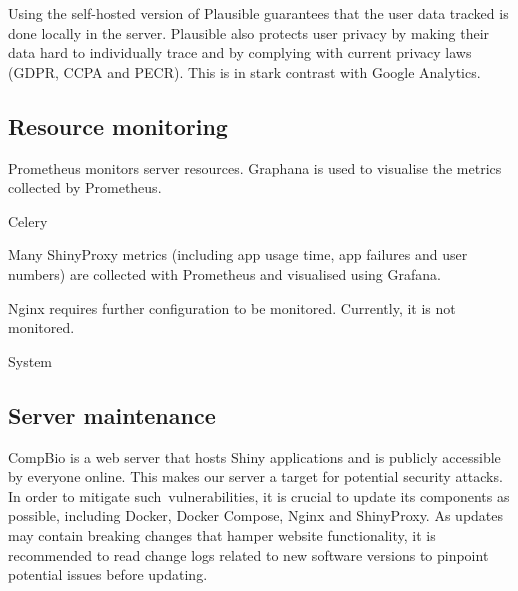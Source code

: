 
Using the self-hosted version of Plausible guarantees that the user data tracked is done locally in the server. Plausible also protects user privacy by making their data hard to individually trace and by complying with current privacy laws (GDPR, CCPA and PECR). This is in stark contrast with Google Analytics.

\subsection{Resource monitoring}

Prometheus monitors server resources. Graphana is used to visualise the metrics collected by Prometheus.

Celery %

Many ShinyProxy metrics (including app usage time, app failures and user numbers) are collected with Prometheus and visualised using Grafana.

Nginx requires further configuration to be monitored. Currently, it is not monitored. %

System %

\subsection{Server maintenance}


CompBio is a web server that hosts Shiny applications and is publicly accessible by everyone online. This makes our server a target for potential security attacks. In order to mitigate such vulnerabilities, it is crucial to update its components as possible, including Docker, Docker Compose, Nginx and ShinyProxy. As updates may contain breaking changes that hamper website functionality, it is recommended to read change logs related to new software versions to pinpoint potential issues before updating.



